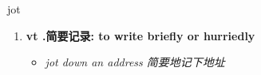 
\begin{frame}
{\huge jot}
\begin{center}
\begin{enumerate}\Large
  \item \textbf{vt .简要记录: to write briefly or hurriedly}
  \begin{itemize}
    \item \em{\Large{jot down an address 简要地记下地址}}
  \end{itemize}
\end{enumerate}
\end{center}
\end{frame}
